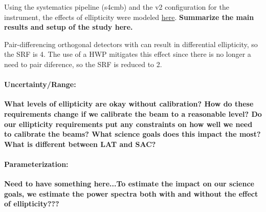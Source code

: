 Using the systematics pipeline (s4cmb) and the v2 configuration for the instrument, the effects of ellipticity were modeled \href{http://simonsobservatory.wikidot.com/instrument-systematic-systmodule#toc5}{here}. \textbf{Summarize the main results and setup of the study here.}

Pair-differencing orthogonal detectors with can result in differential ellipticity, so the SRF is 4. The use of a HWP mitigates this effect since there is no longer a need to pair diference, so the SRF is reduced to 2.

\paragraph{Uncertainty/Range:}
\textbf{What levels of ellipticity are okay without calibration? How do these requirements change if we calibrate the beam to a reasonable level? Do our ellipticity requirements put any constraints on how well we need to calibrate the beams? What science goals does this impact the most? What is different between LAT and SAC?}

\paragraph{Parameterization:}
\textbf{Need to have something here...To estimate the impact on our science goals, we estimate the power spectra both with and without the effect of ellipticity???}
